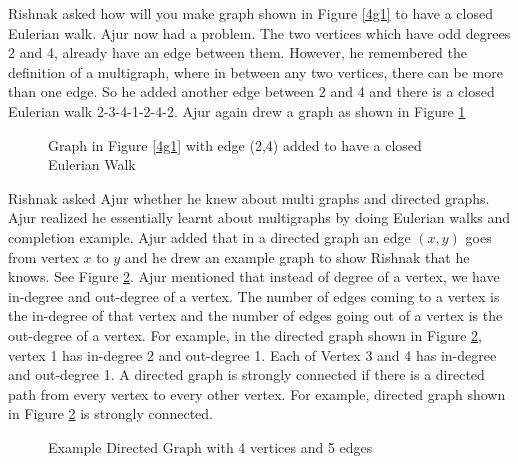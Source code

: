 Rishnak asked how will you make graph shown in Figure \ref{4g1} to have a closed Eulerian walk. Ajur now had a problem. The two vertices which have odd degrees 2 and 4, already have an edge between them. However, he remembered the definition of a multigraph, where in between any two vertices, there can be more than one edge. So he added another edge between 2 and 4 and there is a closed Eulerian walk 2-3-4-1-2-4-2. Ajur again drew a graph as shown in Figure \ref{4g155}
\begin{figure}
\begin{center}
\caption{ Graph in Figure \ref{4g1} with edge (2,4) added to have a closed Eulerian Walk}\label{4g155}
\end{center}
\end{figure}

\vspace{3in}
Rishnak asked Ajur whether he knew about multi graphs and directed graphs. Ajur realized he essentially learnt about multigraphs  by doing Eulerian walks and completion  example. Ajur added that in a directed graph an edge $(x,y)$ goes from vertex $x$ to $y$ and he drew an example graph to show Rishnak that he knows. See Figure \ref{4g5}. Ajur mentioned that instead of degree of a vertex, we have in-degree and out-degree of a vertex. The number of edges coming to a vertex is the in-degree of that vertex and the number of edges going out of a vertex is the out-degree of a vertex. For example, in the directed graph shown in Figure \ref{4g5}, vertex 1 has in-degree 2 and out-degree 1. Each of Vertex 3 and 4 has in-degree  and out-degree 1. A directed graph is strongly connected if there is a directed path from every vertex to every other vertex. For example, directed graph shown in Figure \ref{4g5} is strongly connected. 
\begin{figure}
\begin{center}
\caption{ Example Directed Graph with 4 vertices and 5 edges}\label{4g5}
\end{center}
\end{figure}

